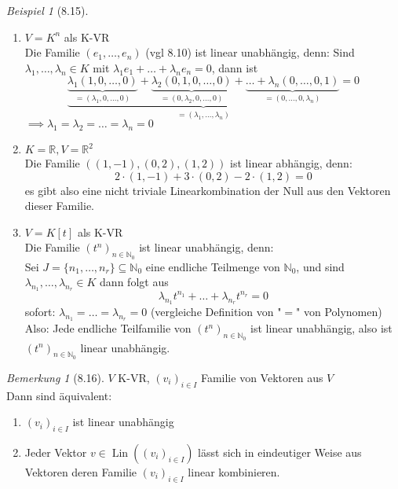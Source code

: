 \documentclass[a4paper]{scrartcl}
\DeclareMathOperator{\Lin}{Lin}
\theoremstyle{definition}
\theoremstyle{plain}
\theoremstyle{plain}
\theoremstyle{remark}
\newtheorem{remark}{Bemerkung}
\theoremstyle{remark}
\theoremstyle{remark}
\theoremstyle{remark}
\theoremstyle{remark}
\newtheorem{ex}{Beispiel}
\begin{document}
\begin{ex}[8.15]
\mbox{}
\begin{enumerate}
\item $V = K^n$ als K-VR \\
         Die Familie $(e_1, \ldots, e_n)$ (vgl 8.10) ist linear unabhängig, denn:
Sind $\lambda_1, \ldots, \lambda_n \in K$ mit $\lambda_1 e_1 + \ldots + \lambda_n e_n = 0$, dann ist
\[\underbrace{\underbrace{\lambda_1 (1, 0, \ldots, 0)}_{=(\lambda_1, 0, \ldots, 0)} + \underbrace{\lambda_2 (0, 1, 0, \ldots, 0)}_{= (0, \lambda_2, 0, \ldots, 0)} + \underbrace{\ldots + \lambda_n (0, \ldots, 0, 1)}_{=(0,\ldots,0,\lambda_n)}}_{= (\lambda_1, \ldots, \lambda_n)} = 0\]
$\implies \lambda_1 = \lambda_2 = \ldots = \lambda_n = 0$
\item $K = \mathbb{R}, V = \mathbb{R}^2$ \\
         Die Familie $((1, -1), (0,2), (1,2))$ ist linear abhängig, denn:
\[2\cdot(1,-1) + 3\cdot(0,2) - 2\cdot(1,2) = 0\]
es gibt also eine nicht triviale Linearkombination der Null aus den Vektoren dieser Familie.
\item $V = K[t]$ als K-VR \\
         Die Familie $(t^n)_{n\in \mathbb{N}_0}$ ist linear unabhängig, denn: \\
         Sei $J = \{n_1, \ldots, n_r\} \subseteq \mathbb{N}_0$ eine endliche Teilmenge von $\mathbb{N}_0$, und sind $\lambda_{n_1}, \ldots, \lambda_{n_r} \in K$
dann folgt aus
\[\lambda_{n_1}t^{n_1} + \ldots + \lambda_{n_r} t^{n_r} = 0\]
sofort: $\lambda_{n_1} = \ldots = \lambda_{n_r} = 0$ (vergleiche Definition von "$=$" von Polynomen)
Also: Jede endliche Teilfamilie von $(t^n)_{n\in\mathbb{N}_0}$ ist linear unabhängig, also ist $(t^n)_{n\in\mathbb{N}_0}$ linear unabhängig.
\end{enumerate}
\end{ex}
\begin{remark}[8.16]
$V$ K-VR, $(v_i)_{i\in I}$ Familie von Vektoren aus $V$ \\
  Dann sind äquivalent:
\begin{enumerate}
\item $(v_i)_{i \in I}$ ist linear unabhängig
\item Jeder Vektor $v \in \Lin((v_i)_{i\in I})$ lässt sich in eindeutiger Weise aus Vektoren deren Familie $(v_i)_{i\in I}$ linear kombinieren.
\end{enumerate}
\end{remark}
\end{document}
